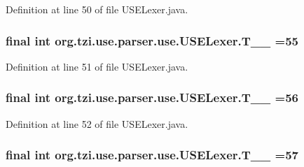 Definition at line 50 of file U\-S\-E\-Lexer.\-java.

\hypertarget{classorg_1_1tzi_1_1use_1_1parser_1_1use_1_1_u_s_e_lexer_a1158ad51da26a947bd339f868336d3d2}{
\subsubsection[{T\-\_\-\-\_\-55}]{\setlength{\rightskip}{0pt plus 5cm}final int org.\-tzi.\-use.\-parser.\-use.\-U\-S\-E\-Lexer.\-T\-\_\-\-\_ =55\hspace{0.3cm}{\ttfamily [static]}}}\label{classorg_1_1tzi_1_1use_1_1parser_1_1use_1_1_u_s_e_lexer_a1158ad51da26a947bd339f868336d3d2}


Definition at line 51 of file U\-S\-E\-Lexer.\-java.

\hypertarget{classorg_1_1tzi_1_1use_1_1parser_1_1use_1_1_u_s_e_lexer_a476cfa6d261826e7a649dbd4d86a1285}{
\subsubsection[{T\-\_\-\-\_\-56}]{\setlength{\rightskip}{0pt plus 5cm}final int org.\-tzi.\-use.\-parser.\-use.\-U\-S\-E\-Lexer.\-T\-\_\-\-\_ =56\hspace{0.3cm}{\ttfamily [static]}}}\label{classorg_1_1tzi_1_1use_1_1parser_1_1use_1_1_u_s_e_lexer_a476cfa6d261826e7a649dbd4d86a1285}


Definition at line 52 of file U\-S\-E\-Lexer.\-java.

\hypertarget{classorg_1_1tzi_1_1use_1_1parser_1_1use_1_1_u_s_e_lexer_a3f6d4597845af79b236be9b9c2cf746e}{
\subsubsection[{T\-\_\-\-\_\-57}]{\setlength{\rightskip}{0pt plus 5cm}final int org.\-tzi.\-use.\-parser.\-use.\-U\-S\-E\-Lexer.\-T\-\_\-\-\_ =57\hspace{0.3cm}{\ttfamily [static]}}}\label{classorg_1_1tzi_1_1use_1_1parser_1_1use_1_1_u_s_e_lexer_a3f6d4597845af79b236be9b9c2cf746e}


